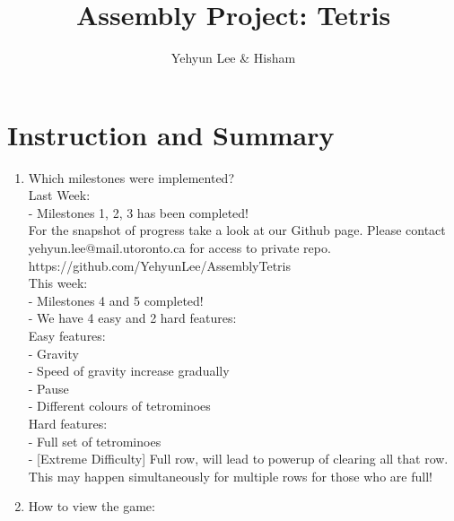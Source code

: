 \documentclass{article}
\title{Assembly Project: Tetris}
\author{Yehyun Lee & Hisham}
\begin{document}
\maketitle

\section{Instruction and Summary}

\begin{enumerate}

    \item Which milestones were implemented? \\

    Last Week:\\
    - Milestones 1, 2, 3 has been completed!\\

    For the snapshot of progress take a look at our Github page. Please contact yehyun.lee@mail.utoronto.ca for access to private repo.\\
    https://github.com/YehyunLee/AssemblyTetris \\

    This week:\\
    - Milestones 4 and 5 completed!\\
    - We have 4 easy and 2 hard features:\\
    
    Easy features:\\
        - Gravity\\
        - Speed of gravity increase gradually\\
        - Pause\\
        - Different colours of tetrominoes\\

    Hard features:\\
        - Full set of tetrominoes\\
        - [Extreme Difficulty] Full row, will lead to powerup of clearing all that row. This may happen simultaneously for multiple rows for those who are full!\\

    \item How to view the game:
    

\end{enumerate}
\end{document}
